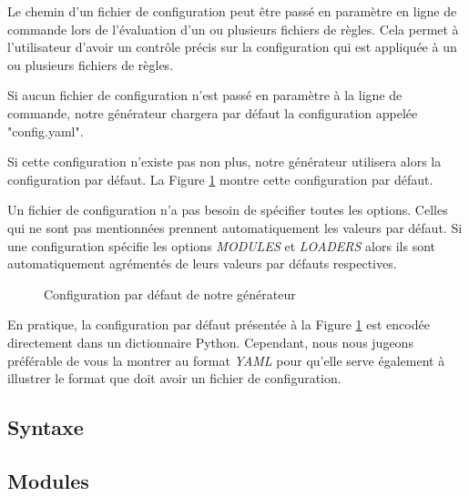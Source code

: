 		Le chemin d'un fichier de configuration peut être passé en paramètre en ligne de commande lors de l'évaluation d'un ou plusieurs fichiers de règles. Cela permet à l'utilisateur d'avoir un contrôle précis sur la configuration qui est appliquée à un ou plusieurs fichiers de règles.
		
		Si aucun fichier de configuration n'est passé en paramètre à la ligne de commande, notre générateur chargera par défaut la configuration appelée "config.yaml".
		
		Si cette configuration n'existe pas non plus, notre générateur utilisera alors la configuration par défaut. La Figure \ref{fig:config:default} montre cette configuration par défaut.
		
		Un fichier de configuration n'a pas besoin de spécifier toutes les options. Celles qui ne sont pas mentionnées prennent automatiquement les valeurs par défaut.	Si une configuration spécifie les options \textit{MODULES} et \textit{LOADERS} alors ils sont automatiquement agrémentés de leurs valeurs par défauts respectives.
		
		\begin{figure}[!]
			\centering
			
			\caption{Configuration par défaut de notre générateur}
			\label{fig:config:default}
		\end{figure}
		
		\begin{note}
			En pratique, la configuration par défaut présentée à la Figure \ref{fig:config:default} est encodée directement dans un dictionnaire Python. Cependant, nous nous jugeons préférable de vous la montrer au format \textit{YAML} pour qu'elle serve également à illustrer le format que doit avoir un fichier de configuration.
		\end{note}
		
	\subsection{Syntaxe}
	
	\subsection{Modules}
		
		